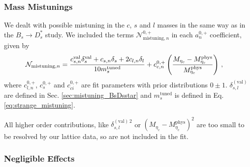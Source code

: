 \subsubsection{Mass Mistunings}

We dealt with possible mistuning in the $c$, $s$ and $l$ masses in the same way as in the $B_s\to D_s^*$ study. We included the terms $\mathcal{N}_{\text{mistuning},n}^{0,+}$ in each $a^{0,+}_n$ coefficient, given by
\begin{align}
  \mathcal{N}_{\text{mistuning},n} &= {c_{s,n}^{\text{val}} \delta^{\text{val}}_s + c_{s,n} \delta_s + 2 c_{l,n} \delta_l \over 10 m_s^{\text{tuned}} }
    \label{eq:mistuning}
  +c_{c,n}^{0,+} \left({ M_{\eta_c} - M_{\eta_c}^{\text{phys}} \over M_{\eta_c}^{\text{phys}}}\right)\,,
\end{align}
where $c^{0,+}_{l,n}$, $c^{0,+}_s$ and $c^{0,+}_{ci}$ are fit parameters with prior distributions $0\pm 1$. $\delta_{s,l}^{(\text{val})}$ are defined in Sec. \ref{sec:mistuning_BsDsstar} and $m_s^{\text{tuned}}$ is defined in Eq. \eqref{eq:strange_mistuning}.



All higher order contributions, like $\delta^{(\text{val})\,2}_{s,l}$ or $(M_{\eta_c}-M_{\eta_c}^{\text{phys}})^2$ are too small to be resolved by our lattice data, so are not included in the fit.

\subsubsection{Negligible Effects}

